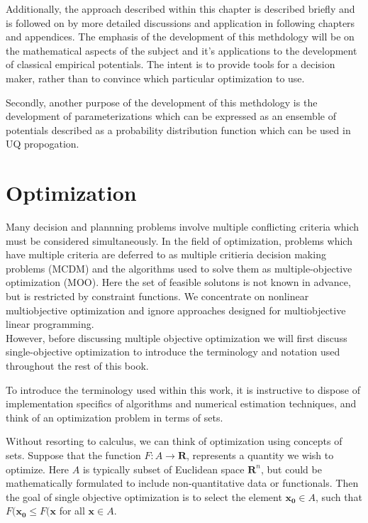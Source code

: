 Additionally, the approach described within this chapter is described briefly and is followed on by more detailed discussions and application in following chapters and appendices.  The emphasis of the development of this methdology will be on the mathematical aspects of the subject and it's applications to the development of classical empirical potentials.  The intent is to provide tools for a decision maker, rather than to convince which particular optimization to use.

Secondly, another purpose of the development of this methdology is the development of parameterizations which can be expressed as an ensemble of potentials described as a probability distribution function which can be used in UQ propogation.


\section{Optimization}

Many decision and plannning problems involve multiple conflicting criteria which must be considered simultaneously.  
In the field of optimization, problems which have multiple criteria are deferred to as multiple critieria decision making problems (MCDM) and the algorithms used to solve them as multiple-objective optimization (MOO).  
Here the set of feasible solutons is not known in advance, but is restricted by constraint functions.  
We concentrate on nonlinear multiobjective optimization and ignore approaches designed for multiobjective linear programming.
\\
However, before discussing multiple objective optimization we will first discuss single-objective optimization to introduce the terminology and notation used throughout the rest of this book.

To introduce the terminology used within this work, it is instructive to dispose of implementation specifics of algorithms and numerical estimation techniques, and think of an optimization problem in terms of sets.


Without resorting to calculus, we can think of optimization using concepts of sets.  
Suppose that the function $F:A \to \bm{R}$, represents a quantity we wish to optimize.  
Here $A$ is typically subset of Euclidean space $\bm{R}^n$, but could be mathematically formulated to include non-quantitative data or functionals.
Then the goal of single objective optimization is to select the element $\bm{x_0} \in A$, such that $F(\bm{x_0} \leq F(\bm{x}$ for all $\bm{x} \in A$.



